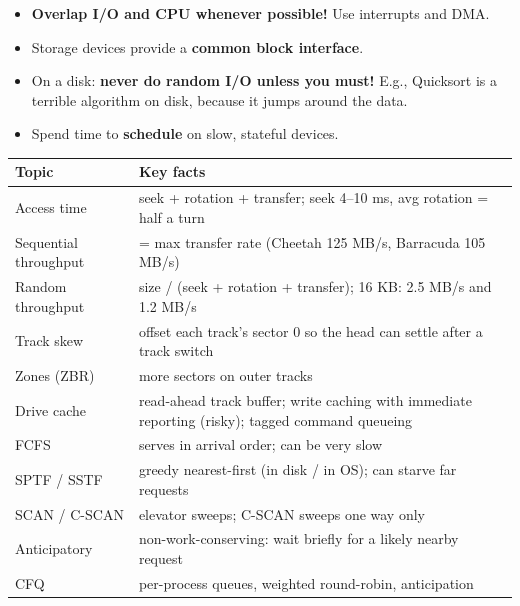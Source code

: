 \documentclass[11pt,a4paper]{article}
\begin{document}
\begin{keybox}[Summary]
\begin{itemize}
  \item \textbf{Overlap I/O and CPU whenever possible!} Use interrupts and
        DMA.
  \item Storage devices provide a \textbf{common block interface}.
  \item On a disk: \textbf{never do random I/O unless you must!} E.g.,
        Quicksort is a terrible algorithm on disk, because it jumps around
        the data.
  \item Spend time to \textbf{schedule} on slow, stateful devices.
\end{itemize}
\end{keybox}

\begin{center}
\renewcommand{\arraystretch}{1.2}
\small
\begin{tabularx}{\textwidth}{@{}lX@{}}
  \toprule
  \textbf{Topic} & \textbf{Key facts} \\
  \midrule
  Access time & seek + rotation + transfer; seek 4--10 ms, avg rotation = half a turn \\
  Sequential throughput & = max transfer rate (Cheetah 125 MB/s, Barracuda 105 MB/s) \\
  Random throughput & size / (seek + rotation + transfer); 16 KB: 2.5 MB/s and 1.2 MB/s \\
  Track skew & offset each track's sector 0 so the head can settle after a track switch \\
  Zones (ZBR) & more sectors on outer tracks \\
  Drive cache & read-ahead track buffer; write caching with immediate reporting (risky); tagged command queueing \\
  FCFS & serves in arrival order; can be very slow \\
  SPTF / SSTF & greedy nearest-first (in disk / in OS); can starve far requests \\
  SCAN / C-SCAN & elevator sweeps; C-SCAN sweeps one way only \\
  Anticipatory & non-work-conserving: wait briefly for a likely nearby request \\
  CFQ & per-process queues, weighted round-robin, anticipation \\
  \bottomrule
\end{tabularx}
\end{center}
\end{document}
